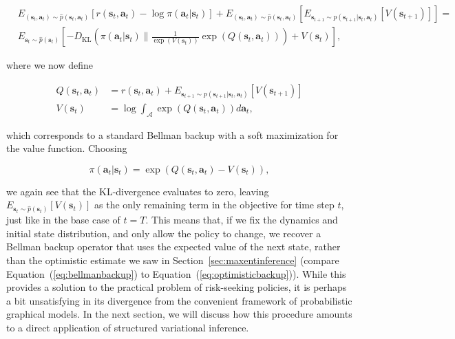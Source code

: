 \begin{align*}
&E_{(\mathbf{s}_t,\mathbf{a}_t)\sim \hat{p}(\mathbf{s}_t,\mathbf{a}_t)}[r(\mathbf{s}_t,\mathbf{a}_t) - \log \pi(\mathbf{a}_t|\mathbf{s}_t)] + E_{(\mathbf{s}_t,\mathbf{a}_t)\sim \hat{p}(\mathbf{s}_t,\mathbf{a}_t)}[ E_{\mathbf{s}_{t+1} \sim p(\mathbf{s}_{t+1}|\mathbf{s}_t,\mathbf{a}_t)} [V(\mathbf{s}_{t+1})] ] = \\
&E_{\mathbf{s}_t \sim \hat{p}(\mathbf{s}_t)}\left[ - D_\text{KL}\left( \pi(\mathbf{a}_t|\mathbf{s}_t) \| \frac{1}{\exp(V(\mathbf{s}_t))}\exp(Q(\mathbf{s}_t,\mathbf{a}_t)) \right) + V(\mathbf{s}_t) \right],
\end{align*}

where we now define

\begin{align}
Q(\mathbf{s}_t,\mathbf{a}_t) &= r(\mathbf{s}_t,\mathbf{a}_t) + E_{\mathbf{s}_{t+1} \sim p(\mathbf{s}_{t+1}|\mathbf{s}_t,\mathbf{a}_t)}[V(\mathbf{s}_{t+1})] \label{eq:bellmanbackup}\\
V(\mathbf{s}_t) &= \log \int_{\mathcal{A}} \exp(Q(\mathbf{s}_t,\mathbf{a}_t)) d\mathbf{a}_t, \nonumber
\end{align}

which corresponds to a standard Bellman backup with a soft maximization for the value function. Choosing

\begin{equation}
\pi(\mathbf{a}_t | \mathbf{s}_t) = \exp \left(
Q(\mathbf{s}_t,\mathbf{a}_t) - V(\mathbf{s}_t)
\right), \label{eq:maxcausalentqpolicy}
\end{equation}

we again see that the KL-divergence evaluates to zero, leaving $E_{\mathbf{s}_t \sim \hat{p}(\mathbf{s}_t)}[V(\mathbf{s}_t)]$ as the only remaining term in the objective for time step $t$, just like in the base case of $t=T$. This means that, if we fix the dynamics and initial state distribution, and only allow the policy to change, we recover a Bellman backup operator that uses the expected value of the next state, rather than the optimistic estimate we saw in Section~\ref{sec:maxentinference} (compare Equation~(\ref{eq:bellmanbackup}) to Equation~(\ref{eq:optimisticbackup})). While this provides a solution to the practical problem of risk-seeking policies, it is perhaps a bit unsatisfying in its divergence from the convenient framework of probabilistic graphical models. In the next section, we will discuss how this procedure amounts to a direct application of structured variational inference.

